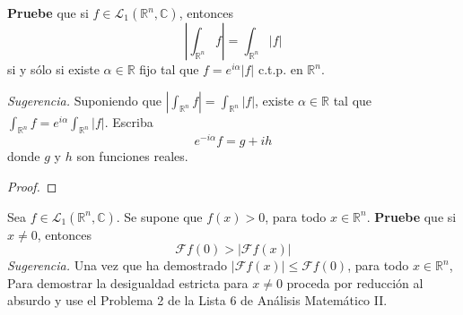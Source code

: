 \documentclass[12pt]{report}
\newcounter{it}
\theoremstyle{largebreak}
\renewcommand{\leq}{\ensuremath{\leqslant}}
\newcommand\abs[1]{\ensuremath{\left|#1\right|}}
\newcommand{\fou}[1]{\ensuremath{\mathcal{F}#1}}
\begin{document}
    \begin{excer}
        \textbf{Pruebe} que si $f\in\mathcal{L}_1(\mathbb{R}^n,\mathbb{C})$, entonces
        \begin{equation*}
            \abs{\int_{\mathbb{R}^n}f}=\int_{\mathbb{R}^n}\abs{f}
        \end{equation*}
        si y sólo si existe $\alpha\in\mathbb{R}$ fijo tal que $f=e^{i\alpha}\abs{f}$ c.t.p. en $\mathbb{R}^n$.

        \textit{Sugerencia.} Suponiendo que $\abs{\int_{\mathbb{R}^n}f}=\int_{\mathbb{R}^n}\abs{f}$, existe $\alpha\in\mathbb{R}$ tal que $\int_{\mathbb{R}^n}f=e^{i\alpha}\int_{\mathbb{R}^n}\abs{f}$. Escriba
        \begin{equation*}
            e^{ -i\alpha}f=g+ih
        \end{equation*}
        donde $g$ y $h$ son funciones reales.
    \end{excer}

    \begin{proof}
        
    \end{proof}

    \begin{excer}
        Sea $f\in\mathcal{L}_1(\mathbb{R}^n,\mathbb{C})$. Se supone que $f(x)>0$, para todo $x\in\mathbb{R}^n$. \textbf{Pruebe} que si $x\neq0$, entonces
        \begin{equation*}
            \fou{f}(0)>\abs{\fou{f}(x)}
        \end{equation*}
        \textit{Sugerencia.} Una vez que ha demostrado $\abs{\fou{f}(x)}\leq\fou{f}(0)$, para todo $x\in\mathbb{R}^n$, Para demostrar la desigualdad estricta para $x\neq0$ proceda por reducción al absurdo y use el Problema 2 de la Lista 6 de Análisis Matemático II.
    \end{excer}
\end{document}
